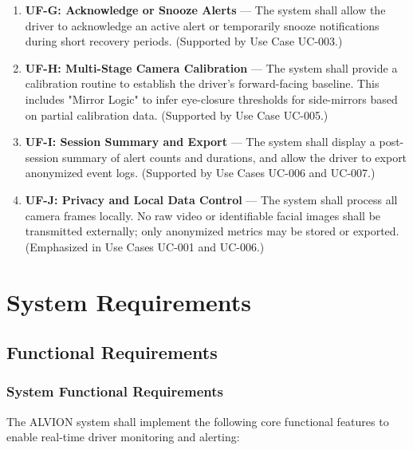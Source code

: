 \documentclass[11pt]{report}
\begin{document}
\begin{enumerate}
    \item \textbf{UF-G: Acknowledge or Snooze Alerts} —
    The system shall allow the driver to acknowledge an active alert or temporarily snooze notifications during short recovery periods. (Supported by Use Case UC-003.)

    \item \textbf{UF-H: Multi-Stage Camera Calibration} —
    The system shall provide a calibration routine to establish the driver's forward-facing baseline. This includes "Mirror Logic" to infer eye-closure thresholds for side-mirrors based on partial calibration data. (Supported by Use Case UC-005.)

    \item \textbf{UF-I: Session Summary and Export} —
    The system shall display a post-session summary of alert counts and durations, and allow the driver to export anonymized event logs. (Supported by Use Cases UC-006 and UC-007.)

    \item \textbf{UF-J: Privacy and Local Data Control} —
    The system shall process all camera frames locally. No raw video or identifiable facial images shall be transmitted externally; only anonymized metrics may be stored or exported. (Emphasized in Use Cases UC-001 and UC-006.)

\end{enumerate}

\section{\textcolor{qcRed}{System Requirements}}

\subsection{Functional Requirements}

\subsubsection{System Functional Requirements}
The ALVION system shall implement the following core functional features to enable real-time driver monitoring and alerting:
\end{document}
